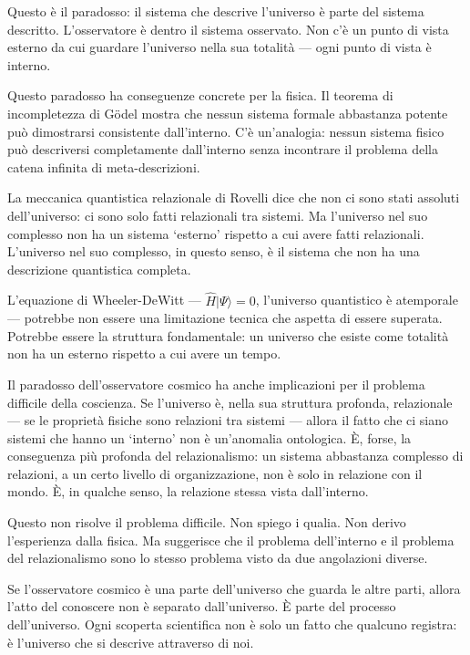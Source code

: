 \documentclass[12pt,a4paper,openany]{book}
\newcommand{\sezione}[1]{\vspace{1.2em}{\large\bfseries #1}\vspace{0.5em}\par}
\begin{document}
Questo è il paradosso: il sistema che descrive l'universo è parte del sistema descritto. L'osservatore è dentro il sistema osservato. Non c'è un punto di vista esterno da cui guardare l'universo nella sua totalità — ogni punto di vista è interno.

\sezione{Le implicazioni per la conoscenza}

Questo paradosso ha conseguenze concrete per la fisica. Il teorema di incompletezza di Gödel mostra che nessun sistema formale abbastanza potente può dimostrarsi consistente dall'interno. C'è un'analogia: nessun sistema fisico può descriversi completamente dall'interno senza incontrare il problema della catena infinita di meta-descrizioni.

La meccanica quantistica relazionale di Rovelli dice che non ci sono stati assoluti dell'universo: ci sono solo fatti relazionali tra sistemi. Ma l'universo nel suo complesso non ha un sistema `esterno' rispetto a cui avere fatti relazionali. L'universo nel suo complesso, in questo senso, è il sistema che non ha una descrizione quantistica completa.

L'equazione di Wheeler-DeWitt — $\hat{H}|\Psi\rangle = 0$, l'universo quantistico è atemporale — potrebbe non essere una limitazione tecnica che aspetta di essere superata. Potrebbe essere la struttura fondamentale: un universo che esiste come totalità non ha un esterno rispetto a cui avere un tempo.

\sezione{Le implicazioni per la mente}

Il paradosso dell'osservatore cosmico ha anche implicazioni per il problema difficile della coscienza. Se l'universo è, nella sua struttura profonda, relazionale — se le proprietà fisiche sono relazioni tra sistemi — allora il fatto che ci siano sistemi che hanno un `interno' non è un'anomalia ontologica. È, forse, la conseguenza più profonda del relazionalismo: un sistema abbastanza complesso di relazioni, a un certo livello di organizzazione, non è solo in relazione con il mondo. È, in qualche senso, la relazione stessa vista dall'interno.

Questo non risolve il problema difficile. Non spiego i qualia. Non derivo l'esperienza dalla fisica. Ma suggerisce che il problema dell'interno e il problema del relazionalismo sono lo stesso problema visto da due angolazioni diverse.

\sezione{Le implicazioni per la vita}

Se l'osservatore cosmico è una parte dell'universo che guarda le altre parti, allora l'atto del conoscere non è separato dall'universo. È parte del processo dell'universo. Ogni scoperta scientifica non è solo un fatto che qualcuno registra: è l'universo che si descrive attraverso di noi.
\end{document}

